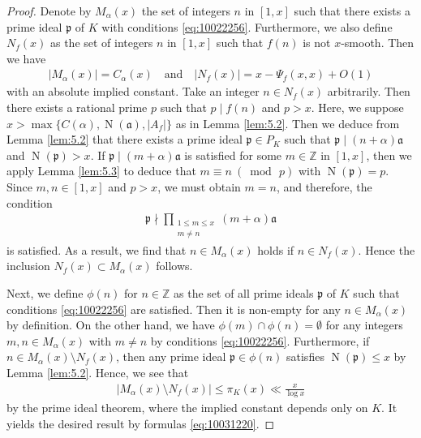 \documentclass[a4paper,11pt]{amsart}
\theoremstyle{definition}
\numberwithin{equation}{section}
\DeclareMathOperator{\norm}{N}
\begin{document}
\begin{proof}
Denote by $M_\alpha(x)$ the set of integers $n$ in $[1,x]$ such that there exists a prime ideal $\mathfrak{p}$ of $K$ with conditions \eqref{eq:10022256}. 
Furthermore, we also define $N_f(x)$ as the set of integers $n$ in $[1,x]$ such that $f(n)$ is not $x$-smooth. 
Then we have
\begin{align}\label{eq:10031220}
|M_\alpha(x)|=C_\alpha(x)
\quad\text{and}\quad
|N_f(x)|=x-\Psi_f(x,x)+O(1)
\end{align}
with an absolute implied constant. 
Take an integer $n \in N_f(x)$ arbitrarily. 
Then there exists a rational prime $p$ such that $p \mid f(n)$ and $p>x$. 
Here, we suppose $x>\max\{C(\alpha), \norm(\mathfrak{a}), |A_f|\}$ as in Lemma \ref{lem:5.2}. 
Then we deduce from Lemma \ref{lem:5.2} that there exists a prime ideal $\mathfrak{p} \in P_K$ such that $\mathfrak{p} \mid (n+\alpha)\mathfrak{a}$ and $\norm(\mathfrak{p})>x$. 
If $\mathfrak{p} \mid (m+\alpha)\mathfrak{a}$ is satisfied for some $m \in \mathbb{Z}$ in $[1,x]$, then we apply Lemma \ref{lem:5.3} to deduce that $m \equiv n ~(\bmod\,{p})$ with $\norm(\mathfrak{p})=p$. 
Since $m,n \in [1,x]$ and $p>x$, we must obtain $m=n$, and therefore, the condition
\begin{align*}
\mathfrak{p} \nmid \prod_{\substack{1 \leq m \leq x \\ m \neq n}} (m+\alpha)\mathfrak{a}
\end{align*}
is satisfied. 
As a result, we find that $n \in M_\alpha(x)$ holds if $n \in N_f(x)$. 
Hence the inclusion $N_f(x) \subset M_\alpha(x)$ follows. 

Next, we define $\phi(n)$ for $n \in \mathbb{Z}$ as the set of all prime ideals $\mathfrak{p}$ of $K$ such that conditions \eqref{eq:10022256} are satisfied. 
Then it is non-empty for any $n \in M_\alpha(x)$ by definition.  
On the other hand, we have $\phi(m) \cap \phi(n)=\emptyset$ for any integers $m,n \in M_\alpha(x)$ with $m \neq n$ by conditions \eqref{eq:10022256}. 
Furthermore, if $n \in M_\alpha(x) \setminus N_f(x)$, then any prime ideal $\mathfrak{p} \in \phi(n)$ satisfies $\norm(\mathfrak{p}) \leq x$ by Lemma \ref{lem:5.2}. 
Hence, we see that
\begin{align*}
\left|M_\alpha(x) \setminus N_f(x)\right|
\leq \pi_K(x)
\ll \frac{x}{\log{x}}
\end{align*}
by the prime ideal theorem, where the implied constant depends only on $K$. 
It yields the desired result by formulas \eqref{eq:10031220}. 
\end{proof}
\end{document}

